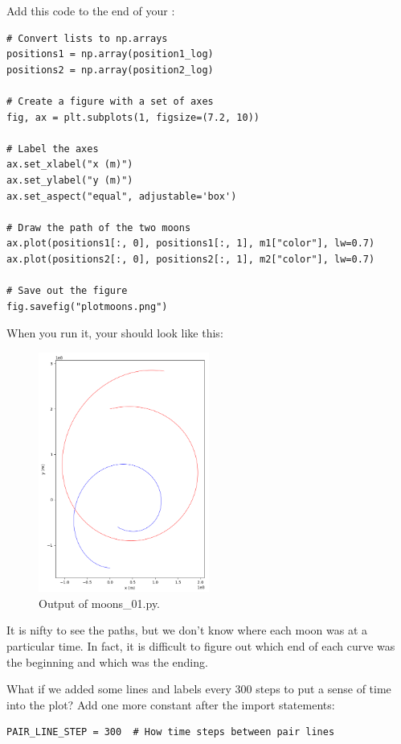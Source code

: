 Add this code to the end of your :

\begin{verbatim}
# Convert lists to np.arrays
positions1 = np.array(position1_log)
positions2 = np.array(position2_log)

# Create a figure with a set of axes
fig, ax = plt.subplots(1, figsize=(7.2, 10))

# Label the axes
ax.set_xlabel("x (m)")
ax.set_ylabel("y (m)")
ax.set_aspect("equal", adjustable='box')

# Draw the path of the two moons
ax.plot(positions1[:, 0], positions1[:, 1], m1["color"], lw=0.7)
ax.plot(positions2[:, 0], positions2[:, 1], m2["color"], lw=0.7)

# Save out the figure
fig.savefig("plotmoons.png")
\end{verbatim}

When you run it, your  should look like this:

\begin{figure}[htbp]
    \centering
    \includegraphics[width=0.5\textwidth]{plotmoons_01.png}
    \caption{Output of moons\_01.py.}
    \label{fig:plotmoons_01}
\end{figure}

It is nifty to see the paths,  but we don't know where each moon was at a particular time.  In fact, it is difficult to figure out which end of each curve was the beginning and which was the ending.

What if we added some lines and labels every 300 steps to put a sense of time into the plot?  Add one more constant after the import statements:
\begin{verbatim}
PAIR_LINE_STEP = 300  # How time steps between pair lines
\end{verbatim}


